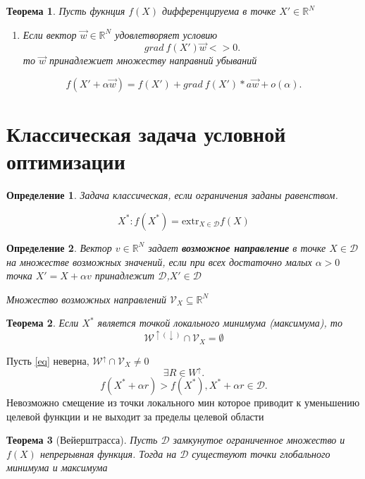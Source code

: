 \documentclass[14pt]{extarticle}
\newtheorem{theorem}{Теорема}
\newtheorem{definition}{Определение}
\begin{document}
\begin{theorem}
	Пусть фукнция $f(X)$ дифференцируема в точке  $X' \in \mathbb{R}^{N}$
	 \begin{enumerate}
	 	\item Если вектор $\vec{w} \in \mathbb{R}^{N}$ удовлетворяет 
			условию
			\[
			grad~f(X') \vec{w} < > 0
			.\] 
		то $\vec{w}$ принадлежиет множеству направний убываний
	 \end{enumerate}
\end{theorem}
\[
f(X' + \alpha \vec{w}) = f(X') + grad ~ f(X')* a \vec{w} + o(\alpha)
.\] 
\section{Классическая задача условной оптимизации}
\begin{definition}
	Задача классическая, если ограничения заданы равенством.
\end{definition}
\begin{equation}
	X^{*} : f(X^{*}) = \text{extr}_{X \in \mathcal{D}} f(X)
\end{equation}
\begin{definition}
	Вектор $v \in\mathbb{R}^{N}$ задает \textbf{возможное направление}
	в точке $X \in \mathcal{D}$ на множестве возможных значений,
	если при всех достаточно малых $\alpha > 0$ точка  $X' = X + \alpha v$ принадлежит  $\mathcal{D}$,$X' \in \mathcal{D}$


	Множество возможных направлений $\mathcal{V}_{X} \subseteq \mathbb{R}^{N}$
\end{definition}
\begin{theorem}
	Если $X^{*}$ является точкой локального минимума (максимума), то
	\begin{equation}
		\label{eq}
		\mathcal{W}^{\uparrow (\downarrow)} \cap \mathcal{V}_{X} = \emptyset
	\end{equation}
\end{theorem}
Пусть \ref{eq} неверна, $\mathcal{W}^{\uparrow} \cap \mathcal{V}_{X} \neq 0$
\[
\exists  R \in W^{\uparrow}
.\] 
\[
f(X^{*} + \alpha r) > f(X^{*}) , X^{*} + \alpha r \in \mathcal{D}
.\] 
Невозможно смещение из точки локального мин которое приводит к уменьшению целевой функции и не выходит за пределы целевой области
\begin{theorem}[Вейерштрасса]
	Пусть $\mathcal{D}$ замкунутое ограниченное множество 
	и $f(X)$ непрерывная функция. Тогда на  $\mathcal{D}$ 
	существуют точки глобального минимума и максимума
\end{theorem}
\end{document}

